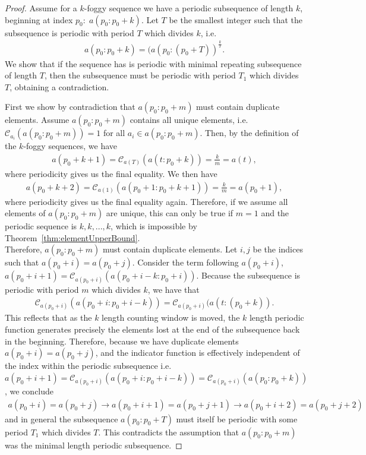 \documentclass{article}
\begin{document}
\begin{proof}
Assume for a $k$-foggy sequence we have a periodic subsequence of length $k$, beginning at index $p_0:\; a(p_0:p_0+k)$. Let $T$ be the smallest integer such that the subsequence is periodic with period $T$ which divides $k$, i.e. 
\begin{align*}
a(p_0:p_0+k) = (a(p_0:(p_0+T))^{\frac{k}{T}}.
\end{align*}
We show that if the sequence has is periodic with minimal repeating subsequence of length $T$, then the subsequence must be periodic with period $T_1$ which divides $T$, obtaining a contradiction. 

First we show by contradiction that $a(p_0:p_0+m)$ must contain duplicate elements. Assume $a(p_0:p_0+m)$ contains all unique elements, i.e. $\mathcal{C}_{a_i}(a(p_0:p_0+m)) = 1$ for all $a_i\in a(p_0:p_0+m)$. Then, by the definition of the $k$-foggy sequences, we have 
\begin{align}
a(p_0+k+1) = \mathcal{C}_{a(T)}(a(t:p_0+k)) = \frac{k}{m} = a(t),
\end{align}
where periodicity gives us the final equality. We then have 
\begin{align}
a(p_0+k+2) = \mathcal{C}_{a(1)}(a(p_0+1:p_0+k+1)) = \frac{k}{m} = a(p_0+1),
\end{align}
where periodicity gives us the final equality again. Therefore, if we assume all elements of $a(p_0:p_0+m)$ are unique, this can only be true if $m=1$ and the periodic sequence is $k,k,...,k$, which is impossible by Theorem~\ref{thm:elementUpperBound}.\\

Therefore, $a(p_0:p_0+m)$ must contain duplicate elements. Let $i,j$ be the indices such that $a(p_0+i) = a(p_0+j)$. Consider the term following $a(p_0+i)$, $a(p_0+i+1) = \mathcal{C}_{a(p_0+i)}(a(p_0+i-k:p_0+i))$. Because the subsequence is periodic with period $m$ which divides $k$, we have that 
\begin{align}
\mathcal{C}_{a(p_0+i)}(a(p_0+i:p_0+i-k)) = \mathcal{C}_{a(p_0+i)}(a(t:(p_0+k)).
\end{align}
This reflects that as the $k$ length counting window is moved, the $k$ length periodic function generates precisely the elements lost at the end of the subsequence back in the beginning. Therefore, because we have duplicate elements $a(p_0+i) = a(p_0+j)$, and the indicator function is effectively independent of the index within the periodic subsequence i.e. $a(p_0+i+1) = \mathcal{C}_{a(p_0+i)}(a(p_0+i:p_0+i-k)) = \mathcal{C}_{a(p_0+i)}(a(p_0:p_0+k))$, we conclude
\begin{align}
a(p_0+i) = a(p_0+j) \rightarrow a(p_0+i+1) = a(p_0+j+1) \rightarrow a(p_0+i+2) = a(p_0+j+2)
\end{align}
and in general the subsequence $a(p_0:p_0+T)$ must itself be periodic with some period $T_1$ which divides $T$. This contradicts the assumption that $a(p_0:p_0+m)$ was the minimal length periodic subsequence.
\end{proof}
\end{document}
